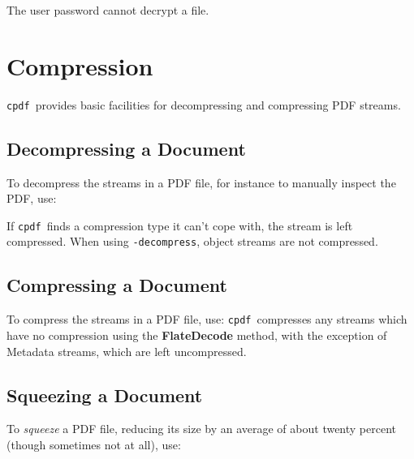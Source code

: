 \documentclass{book}
\newcommand{\cpdf}{\texttt{cpdf}}
\begin{document}
\noindent{}
  \noindent The user password cannot decrypt a file.

\chapter{Compression}

\noindent{}
  \cpdf\ provides basic facilities for decompressing and compressing PDF streams.
  \section{Decompressing a Document}
  To decompress the streams in a PDF file, for instance to manually inspect the
PDF, use:

\noindent{}
  \noindent If \cpdf\ finds a compression type it can't cope with, the stream is left compressed. When using \texttt{-decompress}, object streams are not compressed.
  \section{Compressing a Document}
  To compress the streams in a PDF file, use:
\noindent{}
  \noindent\cpdf\ compresses any streams which have no compression using the
  \textbf{Flate\-Decode} method, with the exception of Metadata streams, which
  are left uncompressed.
  
  \section{Squeezing a Document}
  To \textit{squeeze} a PDF file, reducing its size by an average of about twenty percent (though sometimes not at all), use:
\end{document}
